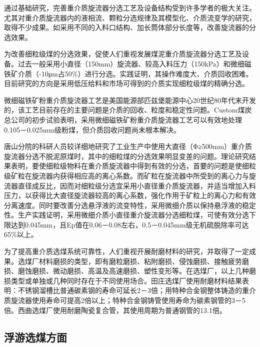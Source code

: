 \documentclass[10pt,openany]{ctexbook}
\begin{document}
通过基础研究，完善重介质旋流器分选工艺及设备结构受到许多学者的极大关注。尤其对重介质旋流器内的液相流、颗粒分选规律及其模型化、介质流变学的研究，取得不少成果。如采用不同的入料口结构、加长筒体部分长度等，改善旋流器的分选效果。\par
为改善细粒级煤的分选效果，促使人们重视发展煤泥重介质旋流器分选工艺及设备。过去一般采用小直径（150mm）旋流器、较高入料压力（150kPa）和微细磁铁矿介质（-10μm占50\%）进行分选。实践证明，其操作难度大、介质回收困难。目前研究的方向是采用低压给料和市场可得到的介质实现细粒级煤的精确分选。\par
微细磁铁矿粉重介质旋流器工艺是美国能源部匹兹堡能源中心20世纪80年代末开发的，该工艺目前存在的主要问题是介质的回收、粒度和稳定性问题。Custom煤炭总公司的初步试验表明，采用微细磁铁矿粉重介质旋流器工艺可以有效地处理0.105－0.025mm级粉煤，但介质回收问题尚未根本解决。\par
唐山分院的科研人员较详细地研究了工业生产中使用大直径（Φ≥500mm）重介质旋流器分选不脱泥原煤时，其中的细粒煤的分选效果明显变差的问题。理论研究结果表明，要使细粒级物料在重介质旋流器中得到有效的分选，首要的问题是使细粒级矿粒在旋流器内获得相应高的离心系数。而矿粒在旋流器中所受到的离心力与旋流器直径成反比，因而对细粒级分选宜采用小直径重介质旋流器，并适当增加入料压力，以获得比大直径旋流器较高的离心系数，强化作用于矿粒上的离心力和有效分离速度。同时要改善分选悬浮液的流变特性，采用微细介质以保持悬浮液的稳定性。生产实践证明，采用微细介质小直径重介旋流器分选细粒煤，可使有效分选下限达到0.045mm，且Ep值在0.06－0.08左右，0.5－0.045mm级无机硫脱除率可达65\%以上。\par
    为了提高重介质选煤系统可靠性，人们重视开展耐磨材料的研究，并取得了一定成果。选煤厂材料磨损的类型，即有磨粒磨损、粘附磨损、侵蚀磨损、接触疲劳磨损、磨蚀磨损、微动磨损、高温及高速磨损、塑性变形等。在选煤厂，以上几种磨损类型或单独或几种同时存在于不同使用场合。田庄选煤厂使用耐磨材料结果表明：不锈钢溜槽比普通碳素钢的寿命可延长2－3倍；用特种合金钢整体铸造的重介质旋流器使用寿命可提高2倍以上；特种合金钢铸管使用寿命为碳素钢管的3－5倍。西曲选煤厂使用耐磨陶瓷复合管，其使用周期为普通钢管的13.1倍。
\subsection{浮游选煤方面}
\end{document}
